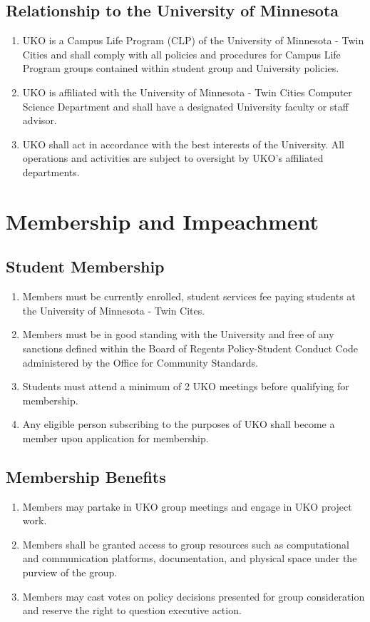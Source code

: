 \documentclass[12pt,executivepaper]{article}
\begin{document}
\subsection{Relationship to the University of Minnesota}
\begin{enumerate}
    \item UKO is a Campus Life Program (CLP) of the University of Minnesota -
          Twin Cities and shall comply with all policies and procedures for
          Campus Life Program groups contained within student group and
          University policies.
    \item UKO is affiliated with the University of Minnesota - Twin Cities
          Computer Science Department and shall have a designated University
          faculty or staff advisor.
    \item UKO shall act in accordance with the best interests of the
          University. All operations and activities are subject to oversight
          by UKO's affiliated departments.
\end{enumerate}

\section{Membership and Impeachment}

\subsection{Student Membership}
\begin{enumerate}
    \item Members must be currently enrolled, student services fee paying
          students at the University of Minnesota - Twin Cites.
    \item Members must be in good standing with the University and free of any
          sanctions defined within the Board of Regents Policy-Student Conduct
          Code administered by the Office for Community Standards.
    \item Students must attend a minimum of 2 UKO meetings before qualifying
          for membership.
    \item Any eligible person subscribing to the purposes of UKO shall become a
          member upon application for membership.
\end{enumerate}

\subsection{Membership Benefits}
\begin{enumerate}
    \item Members may partake in UKO group meetings and engage in UKO project
          work.
    \item Members shall be granted access to group resources such as
          computational and communication platforms, documentation, and
          physical space under the purview of the group.
    \item Members may cast votes on policy decisions presented for group
          consideration and reserve the right to question executive action.
\end{enumerate}
\end{document}
